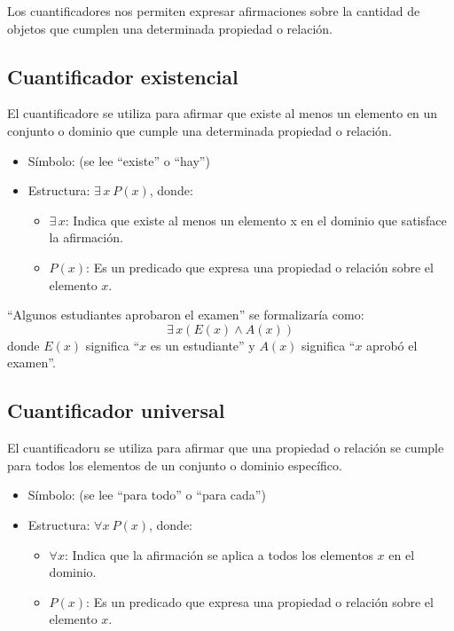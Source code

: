 Los cuantificadores nos permiten expresar afirmaciones sobre la cantidad de objetos que cumplen una determinada propiedad o relación.

\subsection{Cuantificador existencial}  
El \gls{cuantificadore} se utiliza para afirmar que existe al menos un elemento en un conjunto o dominio que cumple una determinada propiedad o relación.
\begin{itemize}
	\item Símbolo:  (se lee ``existe'' o ``hay'')
	\item Estructura: $\exists \, x \ P(x)$, donde:
	\begin{itemize}
		\item $\exists \, x$: Indica que existe al menos un elemento x en el dominio que satisface la afirmación.
		\item $P(x)$: Es un predicado que expresa una propiedad o relación sobre el elemento $x$.
	\end{itemize}
\end{itemize}

\begin{fmd-example}
	``Algunos estudiantes aprobaron el examen'' se formalizaría como: \[\exists \, x \left( E(x) \land A(x) \right)\] donde $E(x)$ significa ``$x$ es un estudiante'' y $A(x)$ significa ``$x$ aprobó el examen''.
\end{fmd-example}

\subsection{Cuantificador universal}
 
El \gls{cuantificadoru} se utiliza para afirmar que una propiedad o relación se cumple para todos los elementos de un conjunto o dominio específico.

\begin{itemize}
	\item Símbolo:  (se lee ``para todo'' o ``para cada'')
	\item Estructura: $\forall x \ P(x)$, donde:
	\begin{itemize}
		\item $\forall x$: Indica que la afirmación se aplica a todos los elementos $x$ en el dominio.
		\item $P(x)$: Es un predicado que expresa una propiedad o relación sobre el elemento $x$.
	\end{itemize}
\end{itemize}

